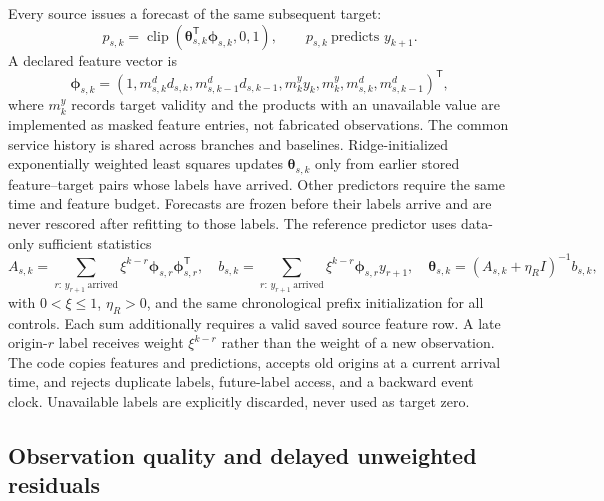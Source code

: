 \documentclass[10pt]{article}
\DeclareMathOperator{\clip}{clip}
\begin{document}
Every source issues a forecast of the same subsequent target:
\begin{equation}
 p_{s,k}=\clip(\boldsymbol\theta_{s,k}^{\mathsf T}\boldsymbol\phi_{s,k},0,1),
 \qquad p_{s,k}\ \text{predicts }y_{k+1}.
 \label{eq:common-forecast}
\end{equation}
A declared feature vector is
\begin{equation}
 \boldsymbol\phi_{s,k}=(1,m^d_{s,k}d_{s,k},m^d_{s,k-1}d_{s,k-1},
 m^y_k y_k,m^y_k,m^d_{s,k},m^d_{s,k-1})^{\mathsf T},
\end{equation}
where $m^y_k$ records target validity and the products with an unavailable value
are implemented as masked feature entries, not fabricated observations.
The common service history is shared across branches and
baselines. Ridge-initialized exponentially weighted least squares updates
$\boldsymbol\theta_{s,k}$ only from earlier stored feature--target pairs whose
labels have arrived. Other predictors require the same time and feature budget.
Forecasts are frozen before their labels arrive and are never rescored after
refitting to those labels.
The reference predictor uses data-only sufficient statistics
\begin{equation}
 A_{s,k}=\sum_{r:\,y_{r+1}\ \mathrm{arrived}}\xi^{k-r}
          \boldsymbol\phi_{s,r}\boldsymbol\phi_{s,r}^{\mathsf T},\quad
 b_{s,k}=\sum_{r:\,y_{r+1}\ \mathrm{arrived}}\xi^{k-r}
          \boldsymbol\phi_{s,r}y_{r+1},\quad
 \boldsymbol\theta_{s,k}=(A_{s,k}+\eta_R I)^{-1}b_{s,k},
\end{equation}
with $0<\xi\le1$, $\eta_R>0$, and the same chronological prefix initialization
for all controls. Each sum additionally requires a valid saved source feature
row. A late origin-$r$ label receives weight $\xi^{k-r}$ rather than the weight
of a new observation. The code copies features and predictions, accepts old
origins at a current arrival time, and rejects duplicate labels, future-label
access, and a backward event clock. Unavailable labels are explicitly discarded,
never used as target zero.

\subsection{Observation quality and delayed unweighted residuals}
\label{sec:reliability}
\end{document}
